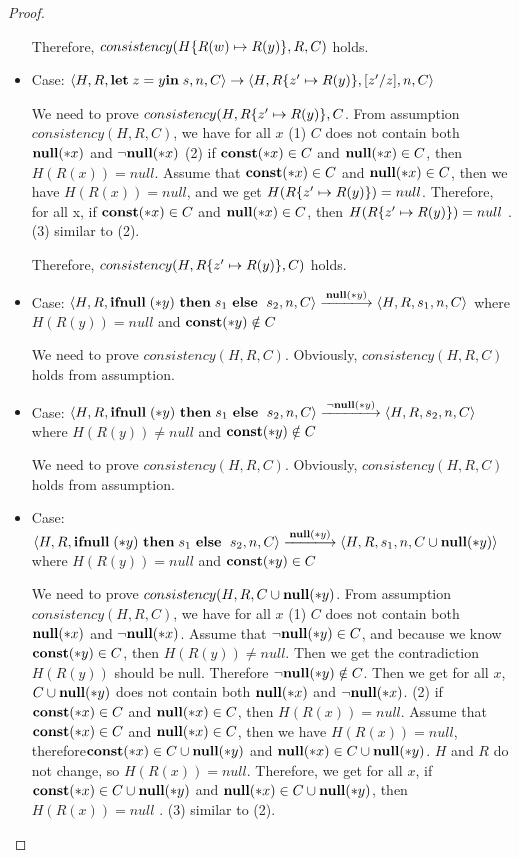 \begin{proof}
\begin{itemize}
    Therefore, \(consistency(H\{R(w) \mapsto R(y)\}, R, C)\) holds.


\item Case: \(\langle H, R, \mathbf{let}\; z = y \mathbf{in}\; s, n, C
  \rangle \rightarrow \langle H, R\{z' \mapsto R(y)\}, [z'/z], n, C
  \rangle \)
  
  We need to prove \(consistency(H, R\{z' \mapsto R(y)\}, C \). From
  assumption \(consistency(H, R, C)\), we have for all \(x\) (1) \(C\)
  does not contain both \({\bf null}(*x)\) and \(\neg{\bf null}(*x)\) (2) if \(\mathbf{const}(*x)
  \in C\) and \({\bf null}(*x) \in C\), then \(H(R(x)) = null\). Assume that
  \(\mathbf{const}(*x) \in C\) and \({\bf null}(*x) \in C\), then we have \(H(R(x)) =
  null\), and we get \(H(R\{z' \mapsto R(y)\}) = null\). Therefore,
  for all x, if \(\mathbf{const}(*x) \in C \) and \({\bf null}(*x) \in C \), then
  \(H(R\{z' \mapsto R(y)\}) = null\) . (3) similar to (2).
                 
    Therefore, \(consistency(H, R\{z' \mapsto R(y)\}, C)\) holds.


\item Case: \(\langle H, R, \IFNULL(*y) \ \THEN s_1\ \ELSE\ s_2, n, C
  \rangle \xlongrightarrow{\NULL(*y)} \langle H, R, s_1, n, C \rangle \)
  where \( H(R(y)) = null \) and \(\mathbf{const}(*y) \notin C\)

  We need to prove \(consistency(H, R, C) \). Obviously,
  \(consistency(H, R, C) \) holds from assumption.

\item Case: \(\langle H, R, \IFNULL(*y) \ \THEN s_1\ \ELSE\ s_2, n, C
  \rangle \xlongrightarrow{\neg\NULL(*y)} \langle H, R, s_2, n, C \rangle \)
  where \( H(R(y)) \ne null \) and \(\mathbf{const}(*y) \notin C\)

  We need to prove \(consistency(H, R, C) \). Obviously,
  \(consistency(H, R, C) \) holds from assumption.


\item Case: \(\langle H, R, \IFNULL(*y) \ \THEN s_1\ \ELSE\ s_2, n, C
  \rangle \xlongrightarrow{\NULL(*y)} \langle H, R, s_1, n, C \cup{\NULL(*y)}
  \rangle \) where \( H(R(y)) =  null \) and \(\mathbf{const}(*y) \in C\)
  
  We need to prove \(consistency(H, R, C\cup{\mathbf{null}(*y)} \). From
  assumption \(consistency(H, R, C)\), we have for all \(x\) (1) \(C\)
  does not contain both \({\bf null}(*x)\) and \(\neg{\bf null}(*x)\). Assume that
  \(\neg\mathbf{null}(*y) \in C\), and because we know \(\mathbf{const}(*y) \in C\),
  then \(H(R(y)) \ne null\). Then we get the contradiction \(H(R(y))\)
  should be null. Therefore \(\neg\mathbf{null}(*y) \notin C\). Then we get
  for all \(x\), \(C \cup{\mathbf{null}(*y)}\) does not contain both
  \({\bf null}(*x)\) and \(\neg{\bf null}(*x)\).  (2) if \(\mathbf{const}(*x) \in C\) and
  \({\bf null}(*x) \in C\), then \(H(R(x)) = null\). Assume that \(\mathbf{const}(*x)
  \in C\) and \({\bf null}(*x) \in C\), then we have \(H(R(x)) = null\),
  therefore\(\mathbf{const}(*x) \in C\cup{\mathbf{null}(*y)}\) and \({\bf null}(*x) \in
  C\cup{\mathbf{null}(*y)}\). \(H\) and \(R\) do not change, so \(H(R(x)) =
  null\). Therefore, we get for all \(x\), if \(\mathbf{const}(*x) \in C\cup{\mathbf{null}(*y)} \)
  and \({\bf null}(*x) \in C\cup{\mathbf{null}(*y)} \), then \(H(R(x)) = null\)
  . (3) similar to (2).
                 

\end{itemize}
\end{proof}
